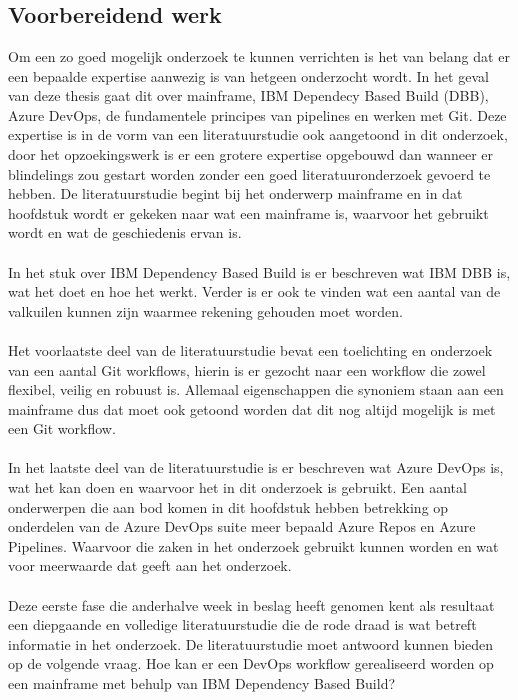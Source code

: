 
\chapter{}%
\label{ch:methodologie}

\section{Voorbereidend werk}
\label{sec:voorbereidend werk}
Om een zo goed mogelijk onderzoek te kunnen verrichten is het van belang dat er een bepaalde expertise aanwezig is van hetgeen onderzocht wordt. In het geval van deze thesis gaat dit over mainframe, IBM Dependecy Based Build (DBB), Azure DevOps, de fundamentele principes van pipelines en werken met Git. Deze expertise is in de vorm van een literatuurstudie ook aangetoond in dit onderzoek, door het opzoekingswerk is er een grotere expertise opgebouwd dan wanneer er blindelings zou gestart worden zonder een goed literatuuronderzoek gevoerd te hebben. De literatuurstudie begint bij het onderwerp mainframe en in dat hoofdstuk wordt er gekeken naar wat een mainframe is, waarvoor het gebruikt wordt en wat de geschiedenis ervan is.
\\ \\
In het stuk over IBM Dependency Based Build is er beschreven wat IBM DBB is, wat het doet en hoe het werkt. 
Verder is er ook te vinden wat een aantal van de valkuilen kunnen zijn waarmee rekening gehouden moet worden.
\\ \\
Het voorlaatste deel van de literatuurstudie bevat een toelichting en onderzoek van een aantal Git workflows, hierin is er gezocht naar een workflow die zowel flexibel, veilig en robuust is.
Allemaal eigenschappen die synoniem staan aan een mainframe dus dat moet ook getoond worden dat dit nog altijd mogelijk is met een Git workflow.
\\ \\
In het laatste deel van de literatuurstudie is er beschreven wat Azure DevOps is, wat het kan doen en waarvoor het in dit onderzoek is gebruikt.
Een aantal onderwerpen die aan bod komen in dit hoofdstuk hebben betrekking op onderdelen van de Azure DevOps suite meer bepaald Azure Repos en Azure Pipelines.
Waarvoor die zaken in het onderzoek gebruikt kunnen worden en wat voor meerwaarde dat geeft aan het onderzoek.
\\ \\
Deze eerste fase die anderhalve week in beslag heeft genomen kent als resultaat een diepgaande en volledige literatuurstudie die de rode draad is wat betreft informatie in het onderzoek. De literatuurstudie moet antwoord kunnen bieden op de volgende vraag. Hoe kan er een DevOps workflow gerealiseerd worden op een mainframe met behulp van IBM Dependency Based Build?

